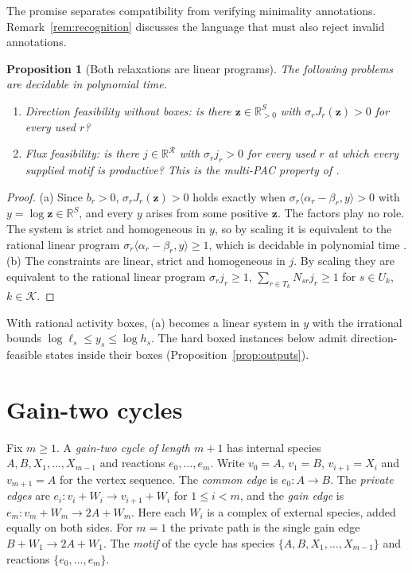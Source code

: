 \documentclass[11pt,a4paper]{article}
\theoremstyle{plain}
\newtheorem{proposition}[theorem]{Proposition}
\theoremstyle{definition}
\theoremstyle{remark}
\newcommand{\R}{\mathbb{R}}
\newcommand{\act}{\boldsymbol z}
\begin{document}
The promise separates compatibility from verifying minimality annotations. Remark~\ref{rem:recognition} discusses the language that must also reject invalid annotations.

\begin{proposition}[Both relaxations are linear programs]\label{prop:relaxations}
The following problems are decidable in polynomial time.
\begin{enumerate}[label=\textup{(\alph*)}]
\item \emph{Direction feasibility} without boxes: is there $\act\in\R^S_{>0}$ with $\sigma_rJ_r(\act)>0$ for every used $r$?
\item \emph{Flux feasibility}: is there $j\in\R^{\mathcal R}$ with $\sigma_rj_r>0$ for every used $r$ at which every supplied motif is productive? This is the multi-PAC property of \citep{kosc2025}.
\end{enumerate}
\end{proposition}

\begin{proof}
(a) Since $b_r>0$, $\sigma_rJ_r(\act)>0$ holds exactly when $\sigma_r\langle\alpha_r-\beta_r,y\rangle>0$ with $y=\log\act\in\R^S$, and every $y$ arises from some positive $\act$. The factors play no role. The system is strict and homogeneous in $y$, so by scaling it is equivalent to the rational linear program $\sigma_r\langle\alpha_r-\beta_r,y\rangle\ge1$, which is decidable in polynomial time \citep{khachiyan1979,schrijver1986}. (b) The constraints are linear, strict and homogeneous in $j$. By scaling they are equivalent to the rational linear program $\sigma_rj_r\ge1$, $\sum_{r\in T_k}N_{sr}j_r\ge1$ for $s\in U_k$, $k\in\mathcal K$.
\end{proof}

With rational activity boxes, (a) becomes a linear system in $y$ with the irrational bounds $\log\ell_s\le y_s\le\log h_s$. The hard boxed instances below admit direction-feasible states inside their boxes (Proposition~\ref{prop:outputs}).

\section{Gain-two cycles}\label{sec:cycle}

Fix $m\ge1$. A \emph{gain-two cycle of length $m+1$} has internal species $A,B,X_1,\ldots,X_{m-1}$ and reactions $e_0,\ldots,e_m$. Write $v_0=A$, $v_1=B$, $v_{i+1}=X_i$ and $v_{m+1}=A$ for the vertex sequence. The \emph{common edge} is $e_0:A\to B$. The \emph{private edges} are $e_i:v_i+W_i\to v_{i+1}+W_i$ for $1\le i<m$, and the \emph{gain edge} is $e_m:v_m+W_m\to2A+W_m$. Here each $W_i$ is a complex of external species, added equally on both sides. For $m=1$ the private path is the single gain edge $B+W_1\to2A+W_1$. The \emph{motif} of the cycle has species $\{A,B,X_1,\ldots,X_{m-1}\}$ and reactions $\{e_0,\ldots,e_m\}$.
\end{document}
